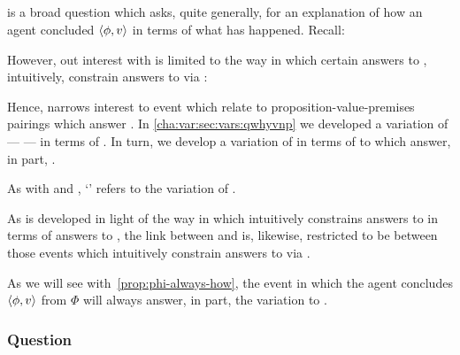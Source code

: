 \subsection{\qHowV{}}
\label{cha:var:sec:vars:qhowv}

\begin{note}
  \qHow{} is a broad question which asks, quite generally, for an explanation of how an agent concluded \(\langle \phi, v \rangle\) in terms of what has happened.
  Recall:

  \begin{quote}%
    \vspace{-1.5\baselineskip}%
    \questionHowBasic*
  \end{quote}

  However, out interest with \qHow{} is limited to the way in which certain answers to \qHow{}, intuitively, constrain answers to \qWhy{} via \issueInclusion{}:

  \begin{quote}%
    \vspace{-1.5\baselineskip}%
    \issueInclusionFirst*
  \end{quote}

  Hence, \issueInclusion{} narrows interest to event which relate to proposition-value-premises pairings which answer \qWhy{}.
  In \autoref{cha:var:sec:vars:qwhyvnp} we developed a variation of \qWhy{} --- \qWhyVnP{} --- in terms of \ros{}.
  In turn, we develop a variation of \qHow{} in terms of  to \ros{} which answer, in part, \qWhyVnP{}.

  As with \qWhy{} and \qWhyVnP{}, `\qHowV{}' refers to the variation of \qHow{}.
\end{note}

\begin{note}
  As \qHowV{} is developed in light of the way in which \issueInclusion{} intuitively constrains answers to \qWhy{} in terms of answers to \qHow{}, the link between \qHowV{} and \qHow{} is, likewise, restricted to be between those events which intuitively constrain answers to \qWhy{} via \issueInclusion{}.
\end{note}

\begin{note}
  As we will see with~\autoref{prop:phi-always-how}, the event in which the agent concludes \(\langle \phi, v \rangle\) from \(\Phi\) will always answer, in part, the variation to \qHow{}.
\end{note}

\subsubsection{Question}
\label{cha:var:sec:vars:qhowv:sec:question}

